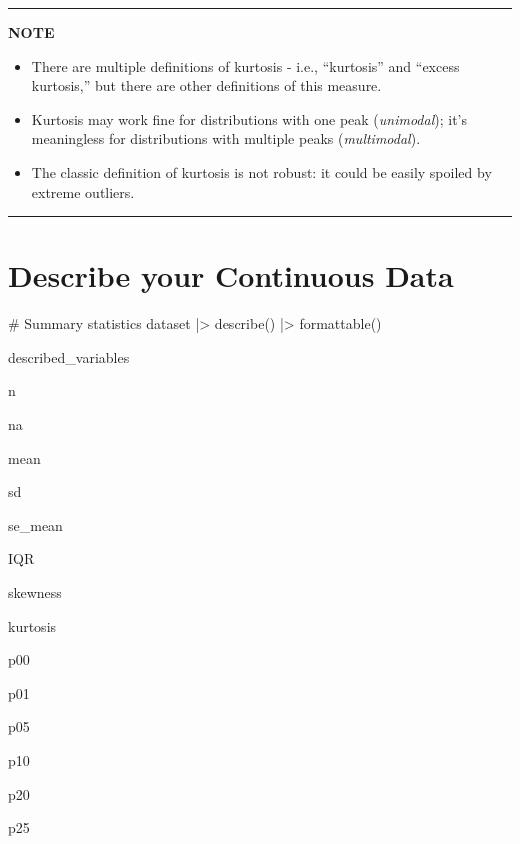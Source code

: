 \documentclass[
  letterpaper,
  DIV=11,
  numbers=noendperiod]{scrreprt}
\newenvironment{Shaded}{\begin{snugshade}}{\end{snugshade}}
\newcommand{\CommentTok}[1]{\textcolor[rgb]{0.37,0.37,0.37}{#1}}
\newcommand{\FunctionTok}[1]{\textcolor[rgb]{0.28,0.35,0.67}{#1}}
\newcommand{\NormalTok}[1]{\textcolor[rgb]{0.00,0.23,0.31}{#1}}
\newcommand{\SpecialCharTok}[1]{\textcolor[rgb]{0.37,0.37,0.37}{#1}}
\providecommand{\tightlist}{%
  \setlength{\itemsep}{0pt}\setlength{\parskip}{0pt}}\usepackage{longtable,booktabs,array}
\begin{document}
\begin{center}\rule{0.5\linewidth}{0.5pt}\end{center}

\textbf{NOTE}

\begin{itemize}
\tightlist
\item
  There are multiple definitions of kurtosis - i.e., ``kurtosis'' and
  ``excess kurtosis,'' but there are other definitions of this measure.
\item
  Kurtosis may work fine for distributions with one peak
  (\emph{unimodal}); it's meaningless for distributions with multiple
  peaks (\emph{multimodal}).
\item
  The classic definition of kurtosis is not robust: it could be easily
  spoiled by extreme outliers.
\end{itemize}

\begin{center}\rule{0.5\linewidth}{0.5pt}\end{center}

\hypertarget{describe-your-continuous-data}{%
\section{Describe your Continuous
Data}\label{describe-your-continuous-data}}

\begin{Shaded}
\begin{Highlighting}[]
\CommentTok{\# Summary statistics }
\NormalTok{dataset }\SpecialCharTok{|\textgreater{}}
  \FunctionTok{describe}\NormalTok{() }\SpecialCharTok{|\textgreater{}}
  \FunctionTok{formattable}\NormalTok{()}
\end{Highlighting}
\end{Shaded}

described\_variables

n

na

mean

sd

se\_mean

IQR

skewness

kurtosis

p00

p01

p05

p10

p20

p25
\end{document}
